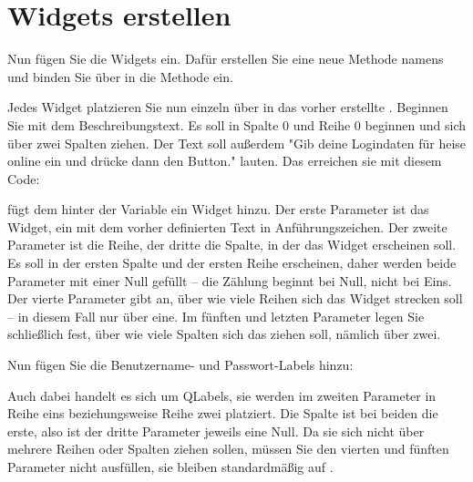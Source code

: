 
\section{Widgets erstellen}

Nun fügen Sie die Widgets ein. Dafür erstellen Sie eine neue Methode namens  und binden Sie über  in die Methode  ein.
    
Jedes Widget platzieren Sie nun einzeln über  in das vorher erstellte . Beginnen Sie mit dem Beschreibungstext. Es soll in Spalte 0 und Reihe 0 beginnen und sich über zwei Spalten ziehen. Der Text soll außerdem "Gib deine Logindaten für heise online ein und drücke dann den Button." lauten. Das erreichen sie mit diesem Code:
 
\medskip


\medskip


 fügt dem  hinter der Variable  ein Widget hinzu. Der erste Parameter ist das Widget, ein  mit dem vorher definierten Text in Anführungszeichen. Der zweite Parameter ist die Reihe, der dritte die Spalte, in der das Widget erscheinen soll. Es soll in der ersten Spalte und der ersten Reihe erscheinen, daher werden beide Parameter mit einer Null gefüllt -- die Zählung beginnt bei Null, nicht bei Eins. Der vierte Parameter gibt an, über wie viele Reihen sich das Widget strecken soll -- in diesem Fall nur über eine. Im fünften und letzten Parameter legen Sie schließlich fest, über wie viele Spalten sich das  ziehen soll, nämlich über zwei.
    
Nun fügen Sie die Benutzername- und Passwort-Labels hinzu:

\medskip



\medskip

Auch dabei handelt es sich um QLabels, sie werden im zweiten Parameter in Reihe eins beziehungsweise Reihe zwei platziert. Die Spalte ist bei beiden die erste, also ist der dritte Parameter jeweils eine Null. Da sie sich nicht über mehrere Reihen oder Spalten ziehen sollen, müssen Sie den vierten und fünften Parameter nicht ausfüllen, sie bleiben standardmäßig auf .
    
